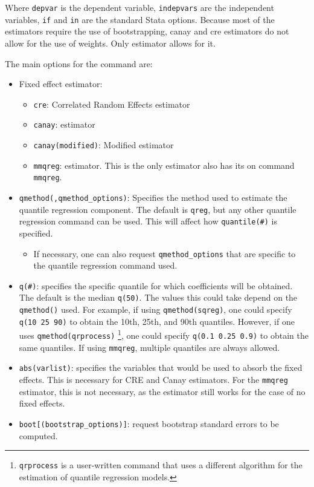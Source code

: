 \documentclass[bib]{statapress}
\providecommand{\tightlist}{%
  \setlength{\itemsep}{0pt}\setlength{\parskip}{0pt}}\usepackage{longtable,booktabs,array}
\begin{document}
Where \texttt{depvar} is the dependent variable, \texttt{indepvars} are
the independent variables, \texttt{if} and \texttt{in} are the standard
Stata options. Because most of the estimators require the use of
bootstrapping, canay and cre estimators do not allow for the use of
weights. Only \citet{mss} estimator allows for it.

The main options for the command are:

\begin{itemize}
\tightlist
\item
  Fixed effect estimator:

  \begin{itemize}
  \tightlist
  \item
    \texttt{cre}: Correlated Random Effects estimator
  \item
    \texttt{canay}: \citet{canay2011} estimator
  \item
    \texttt{canay(modified)}: Modified \citet{canay2011} estimator
  \item
    \texttt{mmqreg}: \citet{mss2019} estimator. This is the only
    estimator also has its on command \texttt{mmqreg}.
  \end{itemize}
\item
  \texttt{qmethod(,qmethod\_options)}: Specifies the method used to
  estimate the quantile regression component. The default is
  \texttt{qreg}, but any other quantile regression command can be used.
  This will affect how \texttt{quantile(\#)} is specified.

  \begin{itemize}
  \tightlist
  \item
    If necessary, one can also request \texttt{qmethod\_options} that
    are specific to the quantile regression command used.
  \end{itemize}
\item
  \texttt{q(\#)}: specifies the specific quantile for which coefficients
  will be obtained. The default is the median \texttt{q(50)}. The values
  this could take depend on the \texttt{qmethod()} used. For example, if
  using \texttt{qmethod(sqreg)}, one could specify
  \texttt{q(10\ 25\ 90)} to obtain the 10th, 25th, and 90th quantiles.
  However, if one uses \texttt{qmethod(qrprocess)} \footnote{\texttt{qrprocess}
    is a user-written command that uses a different algorithm for the
    estimation of quantile regression models.}, one could specify
  \texttt{q(0.1\ 0.25\ 0.9)} to obtain the same quantiles. If using
  \texttt{mmqreg}, multiple quantiles are always allowed.
\item
  \texttt{abs(varlist)}: specifies the variables that would be used to
  absorb the fixed effects. This is necessary for CRE and Canay
  estimators. For the \texttt{mmqreg} estimator, this is not necessary,
  as the estimator still works for the case of no fixed effects.
\item
  \texttt{boot{[}(bootstrap\_options){]}}: request bootstrap standard
  errors to be computed.


\end{itemize}
\end{document}
